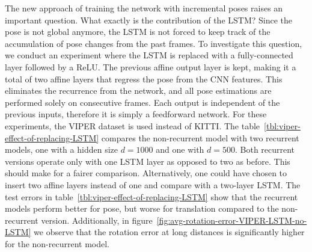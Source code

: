 		The new approach of training the network with incremental poses raises an important question.
		What exactly is the contribution of the LSTM?
		Since the pose is not global anymore, the LSTM is not forced to keep track of the accumulation of pose changes from the past frames.
		To investigate this question, we conduct an experiment where the LSTM is replaced with a fully-connected layer followed by a ReLU.
		The previous affine output layer is kept, making it a total of two affine layers that regress the pose from the CNN features.
		This eliminates the recurrence from the network, and all pose estimations are performed solely on consecutive frames.
		Each output is independent of the previous inputs, therefore it is simply a feedforward network.
		For these experiments, the VIPER dataset is used instead of KITTI.
		The table~\ref{tbl:viper-effect-of-replacing-LSTM} compares the non-recurrent model with two recurrent models, one with a hidden size $d = 1000$ and one with $d = 500$.
		Both recurrent versions operate only with one LSTM layer as opposed to two as before.
		This should make for a fairer comparison.
		Alternatively, one could have chosen to insert two affine layers instead of one and compare with a two-layer LSTM.
		The test errors in table~\ref{tbl:viper-effect-of-replacing-LSTM} show that the recurrent models perform better for pose, but worse for translation compared to the non-recurrent version.
		Additionally, in figure~\ref{fig:avg-rotation-error-VIPER-LSTM-no-LSTM} we observe that the rotation error at long distances is significantly higher for the non-recurrent model.
		
